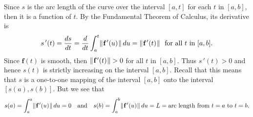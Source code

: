 Since $s$ is the arc length of the curve over the interval $[a,t]$ for each $t$ in $[a,b]$, then it is a function
of $t$. By the Fundamental Theorem of Calculus, its derivative is
\begin{displaymath}
 s\,'(t) = \dfrac{ds}{dt} = \dfrac{d}{dt} \int_{a}^{t} \lVert\mspace{1mu}\textbf{f}\,'(u)\mspace{1mu}\rVert\,du =
 \lVert\mspace{1mu}\textbf{f}\,'(t)\mspace{1mu}\rVert \text{~~for all $t$ in $[a,b]$.}
\end{displaymath}
Since $\textbf{f}(t)$ is smooth, then $\lVert\mspace{1mu}\textbf{f}\,'(t)\mspace{1mu}\rVert > 0$ for all $t$ in $[a,b]$. Thus $s\,'(t) > 0$
and hence $s(t)$ is strictly increasing on the interval $[a,b]$. Recall that this means that $s$ is a one-to-one mapping
of the interval $[a,b]$ onto the interval $[s(a),s(b)]$. But we see that
\begin{displaymath}
 s(a) = \int_{a}^{a} \lVert\mspace{1mu}\textbf{f}\,'(u)\mspace{1mu}\rVert\,du = 0 \quad \text{and} \quad
 s(b) = \int_{a}^{b} \lVert\mspace{1mu}\textbf{f}\,'(u)\mspace{1mu}\rVert\,du = L = \text{arc length from $t = a$ to $t = b$.}
\end{displaymath}

